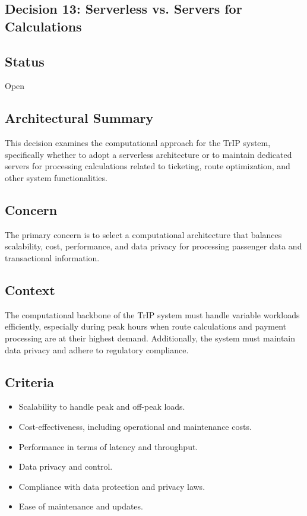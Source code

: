 \subsection{Decision 13: Serverless vs. Servers for Calculations}

\subsection*{Status}
Open

\subsection*{Architectural Summary}
This decision examines the computational approach for the TrIP system, specifically whether to adopt a serverless architecture or to maintain dedicated servers for processing calculations related to ticketing, route optimization, and other system functionalities.

\subsection*{Concern}
The primary concern is to select a computational architecture that balances scalability, cost, performance, and data privacy for processing passenger data and transactional information.

\subsection*{Context}
The computational backbone of the TrIP system must handle variable workloads efficiently, especially during peak hours when route calculations and payment processing are at their highest demand. Additionally, the system must maintain data privacy and adhere to regulatory compliance.

\subsection*{Criteria}
\begin{itemize}
    \item Scalability to handle peak and off-peak loads.
    \item Cost-effectiveness, including operational and maintenance costs.
    \item Performance in terms of latency and throughput.
    \item Data privacy and control.
    \item Compliance with data protection and privacy laws.
    \item Ease of maintenance and updates.
\end{itemize}

